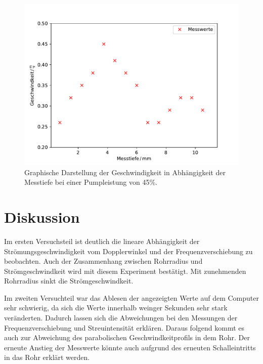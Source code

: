         \begin{figure}
            \centering
            \includegraphics[scale=0.5]{pump45v.pdf}
            \caption{Graphische Darstellung der Geschwindigkeit in Abhängigkeit der Messtiefe bei einer Pumpleistung von 45\%.}
            \label{fig:pump45v}
          \end{figure}
\section{Diskussion}
Im ersten Versuchsteil ist deutlich die lineare Abhängigkeit der Strömungsgeschwindigkeit
vom Dopplerwinkel und der Frequenzverschiebung zu beobachten. Auch der Zusammenhang zwischen
Rohrradius und Strömgeschwindkeit wird mit diesem Experiment bestätigt. Mit zunehmenden Rohrradius
sinkt die Strömgeschwindkeit.

Im zweiten Versuchteil war das Ablesen der angezeigten Werte auf dem Computer
sehr schwierig, da sich die Werte innerhalb weinger Sekunden sehr stark veränderten.
Dadurch lassen sich die Abweichungen bei den Messungen der Frequenzverschiebung und
Streuintensität erklären. Daraus folgend kommt es auch zur Abweichung des parabolischen
Geschwindkeitprofils in dem Rohr. Der erneute Anstieg der Messwerte könnte auch aufgrund
des erneuten Schalleintritts in das Rohr erklärt werden.
